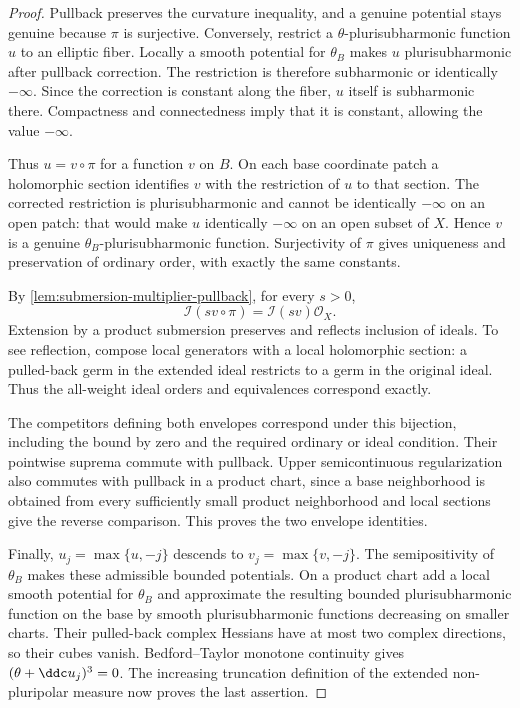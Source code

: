 \begin{proof}
Pullback preserves the curvature inequality, and a genuine potential stays genuine because $\pi$ is surjective. Conversely, restrict a $\theta$-plurisubharmonic function $u$ to an elliptic fiber. Locally a smooth potential for $\theta_B$ makes $u$ plurisubharmonic after pullback correction. The restriction is therefore subharmonic or identically $-\infty$. Since the correction is constant along the fiber, $u$ itself is subharmonic there. Compactness and connectedness imply that it is constant, allowing the value $-\infty$.

Thus $u=v\circ\pi$ for a function $v$ on $B$. On each base coordinate patch a holomorphic section identifies $v$ with the restriction of $u$ to that section. The corrected restriction is plurisubharmonic and cannot be identically $-\infty$ on an open patch: that would make $u$ identically $-\infty$ on an open subset of $X$. Hence $v$ is a genuine $\theta_B$-plurisubharmonic function. Surjectivity of $\pi$ gives uniqueness and preservation of ordinary order, with exactly the same constants.

By \cref{lem:submersion-multiplier-pullback}, for every $s>0$,
\[
 \mathcal I(sv\circ\pi)=\mathcal I(sv)\mathcal O_X.
\]
Extension by a product submersion preserves and reflects inclusion of ideals. To see reflection, compose local generators with a local holomorphic section: a pulled-back germ in the extended ideal restricts to a germ in the original ideal. Thus the all-weight ideal orders and equivalences correspond exactly.

The competitors defining both envelopes correspond under this bijection, including the bound by zero and the required ordinary or ideal condition. Their pointwise suprema commute with pullback. Upper semicontinuous regularization also commutes with pullback in a product chart, since a base neighborhood is obtained from every sufficiently small product neighborhood and local sections give the reverse comparison. This proves the two envelope identities.

Finally, $u_j=\max\{u,-j\}$ descends to $v_j=\max\{v,-j\}$. The semipositivity of $\theta_B$ makes these admissible bounded potentials. On a product chart add a local smooth potential for $\theta_B$ and approximate the resulting bounded plurisubharmonic function on the base by smooth plurisubharmonic functions decreasing on smaller charts. Their pulled-back complex Hessians have at most two complex directions, so their cubes vanish. Bedford--Taylor monotone continuity gives $(\theta+\ddc u_j)^3=0$. The increasing truncation definition of the extended non-pluripolar measure now proves the last assertion.
\end{proof}

